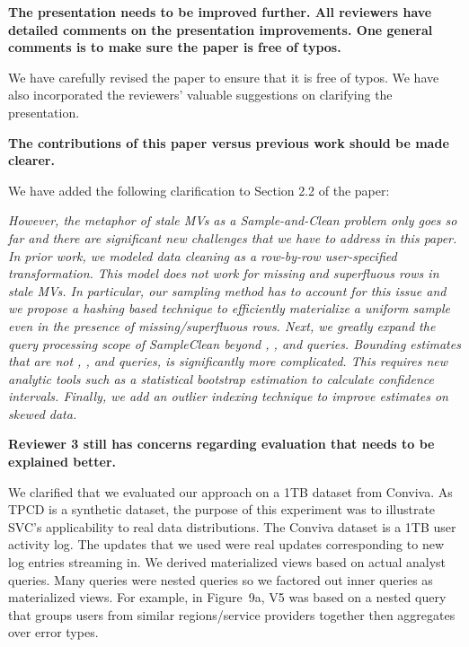 \vspace{1.5em}

\textbf{The presentation needs to be improved further. All reviewers have detailed comments on the presentation improvements. One general comments is to make sure the paper is free of typos.}

We have carefully revised the paper to ensure that it is free of typos. We have also incorporated the reviewers' valuable suggestions on clarifying the presentation.

\vspace{1.5em}

\textbf{The contributions of this paper versus previous work should be made clearer.}

We have added the following clarification to Section 2.2 of the paper:

\emph{However, the metaphor of stale MVs as a Sample-and-Clean problem only goes so far and there are significant new challenges that we have to address in this paper. In prior work, we modeled data cleaning as a row-by-row user-specified transformation.
This model does not work for missing and superfluous rows in stale MVs. In particular, our sampling method has to account for this issue and we propose a hashing based technique to efficiently materialize a uniform sample even in the presence of missing/superfluous rows. Next, we greatly expand the query processing scope of SampleClean beyond \sumfunc, \countfunc, and \avgfunc queries. Bounding estimates that are not \sumfunc, \countfunc, and \avgfunc queries, is significantly more complicated. This requires new analytic tools such as a statistical bootstrap estimation to calculate confidence intervals. Finally, we add an outlier indexing technique to improve estimates on skewed data.}

\vspace{1.5em}

\textbf{Reviewer 3 still has concerns regarding evaluation that needs to be explained better.}

We clarified that we evaluated our approach on a 1TB dataset from Conviva. As TPCD is a synthetic dataset, the purpose of this experiment was to illustrate SVC's applicability to real data distributions. The Conviva dataset is a 1TB user activity log. The updates that we used were real updates corresponding to new log entries streaming in. We derived materialized views based on actual analyst queries. Many queries were nested queries so we factored out inner queries as materialized views. For example, in Figure~9a, V5 was based on a nested query that groups users from similar regions/service providers together then aggregates over error types.  %

